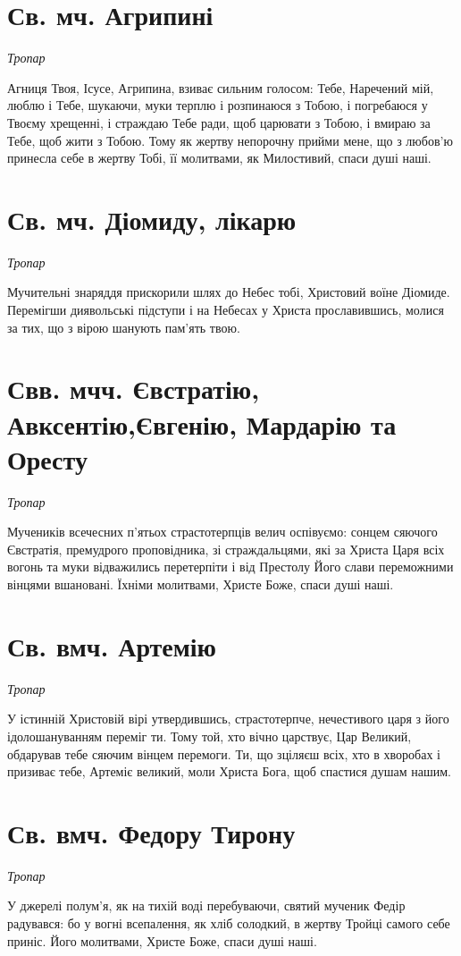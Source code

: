 \documentclass[chapters.tex]{subfiles}
\begin{document}
\section{Св. мч. Агрипині}
\emph{Тропар}

Агниця Твоя, Ісусе, Агрипина, взиває сильним голосом: Тебе, Наречений мій, люблю і Тебе, шукаючи, муки терплю і розпинаюся з Тобою, і погребаюся у Твоєму хрещенні, і страждаю Тебе ради, щоб царювати з Тобою, і вмираю за Тебе, щоб жити з Тобою. Тому як жертву непорочну прийми мене, що з любов’ю принесла себе в жертву Тобі, її молитвами, як Милостивий, спаси душі наші.

\section{Св. мч. Діомиду, лікарю}
\emph{Тропар}

Мучительні знаряддя прискорили шлях до Небес тобі, Христовий воїне Діомиде. Перемігши диявольські підступи і на Небесах у Христа прославившись, молися за тих, що з вірою шанують пам’ять твою.

\section{Свв. мчч. Євстратію, Авксентію,Євгенію, Мардарію та Оресту}
\emph{Тропар}

Мучеників всечесних п’ятьох страстотерпців велич оспівуємо: сонцем сяючого Євстратія, премудрого проповідника, зі страждальцями, які за Христа Царя всіх вогонь та муки відважились перетерпіти і від Престолу Його слави переможними вінцями вшановані. Їхніми молитвами, Христе Боже, спаси душі наші.

\section{Св. вмч. Артемію}
\emph{Тропар}

У істинній Христовій вірі утвердившись, страстотерпче, нечестивого царя з його ідолошануванням переміг ти. Тому той, хто вічно царствує, Цар Великий, обдарував тебе сяючим вінцем перемоги. Ти, що зціляєш всіх, хто в хворобах і призиває тебе, Артеміє великий, моли Христа Бога, щоб спастися душам нашим.

\section{Св. вмч. Федору Тирону}
\emph{Тропар}

У джерелі полум’я, як на тихій воді перебуваючи, святий мученик Федір радувався: бо у вогні всепалення, як хліб солодкий, в жертву Тройці самого себе приніс. Його молитвами, Христе Боже, спаси душі наші.
\end{document}
